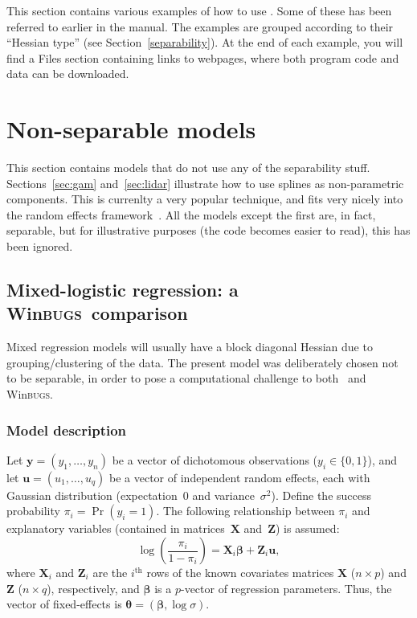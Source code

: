 \documentclass{admbmanual}
\newcommand{\scWinBUGS}{Win\textsc{bugs}}
\begin{document}
This section contains various examples of how to use \scAR. Some of
these has been referred to earlier in the manual. The examples are grouped according
to their ``Hessian type'' (see Section~\ref{separability}). At the end of each example,
you will find a Files section containing links to webpages, where both program code
and data can be downloaded.


\section{Non-separable models}

This section contains models that do not use any of the separability stuff.
Sections~\ref{sec:gam} and~\ref{sec:lidar}
illustrate how to use splines as non-parametric components. This is currenlty
a very popular technique, and fits very nicely
into the random effects framework~\cite{rupp:wand:carr:2003}. 
All the models except the first are, in fact, separable, but for illustrative purposes (the code becomes easier to read),
this has been ignored.


\subsection{Mixed-logistic regression: a \scWinBUGS\ comparison}
\label{sec:logistic_example}

Mixed regression models will usually have a block diagonal Hessian
due to grouping/clustering of the data. The present model was deliberately
chosen not to be separable, in order to pose a computational challenge
to both \scAR\ and \scWinBUGS. 


\subsubsection{Model description}

Let $\mathbf{y}=(y_1,\ldots,y_n)$ be a vector of dichotomous observations
($y_i\in\{0,1\}$), and let $\mathbf{u}=(u_1,\ldots,u_q)$ be a vector of
independent random effects, each with Gaussian distribution (expectation~$0$ and
variance~$\sigma^2$). Define the success probability $\pi_i=\Pr(y_i=1)$. The
following relationship between $\pi_i$ and explanatory variables (contained in
matrices~$\mathbf{X}$ and~$\mathbf{Z}$) is assumed:
\[
  \log\left(\frac{\pi_i}{1-\pi_i}\right) = \mathbf{X}_i\mathbf{\beta} +
  \mathbf{Z}_i\mathbf{u},
\]
where $\mathbf{X}_i$ and $\mathbf{Z}_i$ are the $i^\textrm{th}$ rows of the known
covariates matrices $\mathbf{X}$ ($n\times p$) and $\mathbf{Z}$ ($n\times q$),
respectively, and $\mathbf{\beta}$ is a $p$-vector of regression parameters.
Thus, the vector of fixed-effects is
$\mathbf{\theta}=(\mathbf{\beta},\log\sigma)$.
\end{document}
